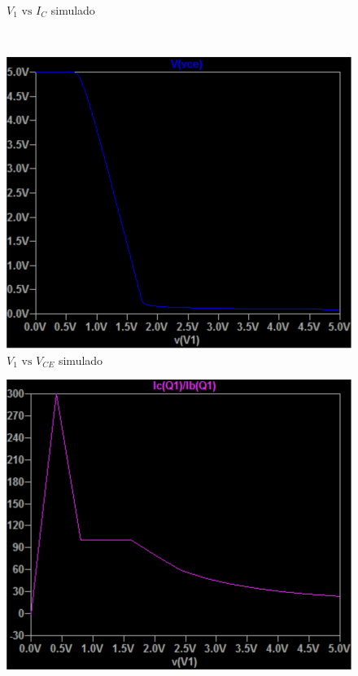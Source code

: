 \documentclass[a4paper]{article}
\begin{document}
\begin{minipage}{\textwidth}
\begin{minipage}{0.49\textwidth}
\begin{figure}[H]
            \caption{$V_1\text{ vs }I_C$ simulado}
            \label{fig:bjt_e_3}
        \end{figure}
    \end{minipage}
\end{minipage} \\
\begin{minipage}{\textwidth}
    \begin{minipage}{0.49\textwidth}
        \begin{figure}[H]
            \centering
            \includegraphics[width=\textwidth]{IMG/bjt_e_1.png}
            \caption{$V_1\text{ vs }V_{CE}$ simulado}
            \label{fig:bjt_e_1}
        \end{figure}
    \end{minipage}\hfill
    \begin{minipage}{0.49\textwidth}
        \begin{figure}[H]
            \centering
            \includegraphics[width=\textwidth]{IMG/bjt_e_4.png}

\end{figure}
\end{minipage}
\end{minipage}
\end{document}

